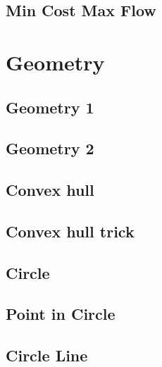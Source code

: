 \subsection{Min Cost Max Flow}
\raggedbottom
\hrulefill


\section{Geometry}
\subsection{Geometry 1}
\raggedbottom
\subsection{Geometry 2}
\raggedbottom
\subsection{Convex hull}
\subsection{Convex hull trick}
\raggedbottom
\raggedbottom
\subsection{Circle}
\raggedbottom
\subsection{Point in Circle}
\raggedbottom
\subsection{Circle Line}
\raggedbottom
\hrulefill